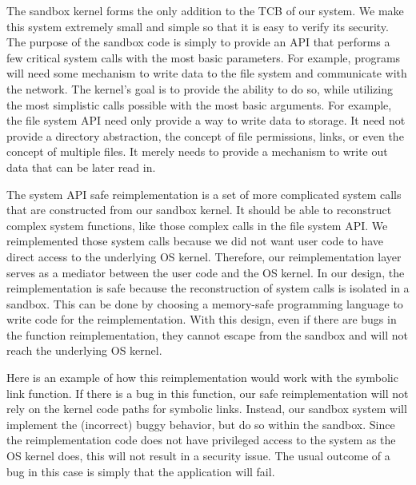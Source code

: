 The sandbox kernel forms the only addition to the TCB of our system.  We 
make this system extremely small and simple so that it is easy to verify its 
security.  The purpose of the sandbox code is simply to provide an API that performs
a few critical system calls with the most basic parameters.  For example,
programs will need some mechanism to write data to the file system
and communicate with the network.  The kernel's goal is to provide the ability
to do so, while utilizing the most simplistic calls possible with the most
basic arguments.  For example, the file system API need only provide a way
to write data to storage.  It need not provide a directory abstraction, the
concept of file permissions, links, or even the concept of multiple files.
It merely needs to provide a mechanism to write out data that can be later
read in.  


The system API safe reimplementation is a set of more complicated system calls 
that are constructed from our sandbox kernel. It should be able to reconstruct 
complex system functions, like those complex calls in the file system API. 
We reimplemented those system calls because we did not want user code 
to have direct access to the underlying OS kernel. 
Therefore, our reimplementation layer serves as a mediator between the user code 
and the OS kernel. In our design, the reimplementation is safe 
because the reconstruction of system calls is isolated in a sandbox. 
This can be done by choosing a memory-safe programming language to write code for the reimplementation. 
With this design, even if there are bugs in the function reimplementation, 
they cannot escape from the sandbox and will not reach the underlying OS kernel. 

Here is an example of how this reimplementation would work with the symbolic link function. 
  
If there is a bug in this function, our safe reimplementation will not rely on the kernel code paths for symbolic links. 
Instead, our sandbox system will implement the (incorrect) buggy behavior,  but do so within the sandbox. 
Since the reimplementation code does not have privileged access to the system as the OS kernel does, 
this will not result in a security issue. The usual outcome of a bug in this case is simply that the application will fail.

